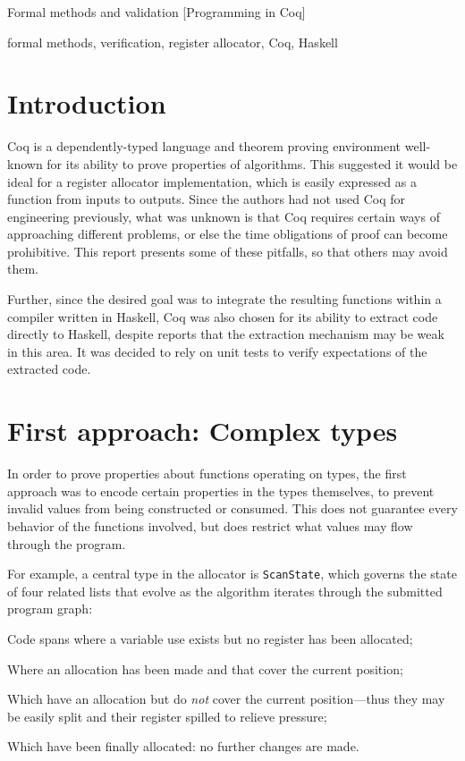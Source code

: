 \documentclass[preprint]{sigplanconf}
\begin{document}
                {Formal methods and validation}
                [Programming in Coq]


\keywords
formal methods, verification, register allocator, Coq, Haskell

\section{Introduction}
\label{sec:intro}

Coq is a dependently-typed language and theorem proving environment well-known
for its ability to prove properties of algorithms. This suggested it would be
ideal for a register allocator implementation, which is easily expressed as a
function from inputs to outputs. Since the authors had not used Coq for
engineering previously, what was unknown is that Coq requires certain ways of
approaching different problems, or else the time obligations of proof can
become prohibitive. This report presents some of these pitfalls, so that
others may avoid them.

Further, since the desired goal was to integrate the resulting functions
within a compiler written in Haskell, Coq was also chosen for its ability to
extract code directly to Haskell, despite reports that the extraction
mechanism may be weak in this area. It was decided to rely on unit tests to
verify expectations of the extracted code.

\section{First approach: Complex types}

In order to prove properties about functions operating on types, the first
approach was to encode certain properties in the types themselves, to prevent
invalid values from being constructed or consumed. This does not guarantee
every behavior of the functions involved, but does restrict what values may
flow through the program.

For example, a central type in the allocator is \verb|ScanState|, which
governs the state of four related lists that evolve as the algorithm iterates
through the submitted program graph:

\begin{description}[noitemsep]
\item[Unhandled intervals] Code spans where a variable use exists but no
  register has been allocated;
\item[Active intervals] Where an allocation has been made and that cover the
  current position;
\item[Inactive intervals] Which have an allocation but do \emph{not} cover the
  current position---thus they may be easily split and their register spilled
  to relieve pressure;
\item[Handled intervals] Which have been finally allocated: no further
  changes are made.
\end{description}
\end{document}
